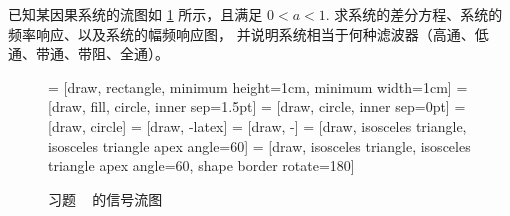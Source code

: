 \begin{exercise}
    已知某因果系统的流图如 \ref{fig:chap4-part1-quiz2} 所示，且满足 $0 < a < 1$.
    求系统的差分方程、系统的频率响应、以及系统的幅频响应图，
    并说明系统相当于何种滤波器（高通、低通、带通、带阻、全通）。
    \begin{figure}[H]
        \centering
         = [draw, rectangle, minimum height=1cm, minimum width=1cm]
         = [draw, fill, circle, inner sep=1.5pt]
         = [draw, circle, inner sep=0pt]
         = [draw, circle]
         = [draw, -latex]
         = [draw, -]
         = [draw, isosceles triangle, isosceles triangle apex angle=60]
         = [draw, isosceles triangle, isosceles triangle apex angle=60, shape border rotate=180]
        \caption{习题 \theexercise~ 的信号流图}
        \label{fig:chap4-part1-quiz2}
    \end{figure}
\end{exercise}

